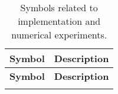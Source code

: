 \begin{longtable}{c p{10cm}}
    \caption{Symbols related to implementation and numerical experiments.}\label{tab:implementation_symbols}                                                                      \\
    \hline
    \textbf{Symbol}                                    & \textbf{Description}                                                                                                     \\
    \hline
    \endfirsthead

    \hline
    \textbf{Symbol}                                    & \textbf{Description}                                                                                                     \\
    \hline
    \endhead

    \hline
    \endfoot

    \hline
    \endlastfoot


\end{longtable}
